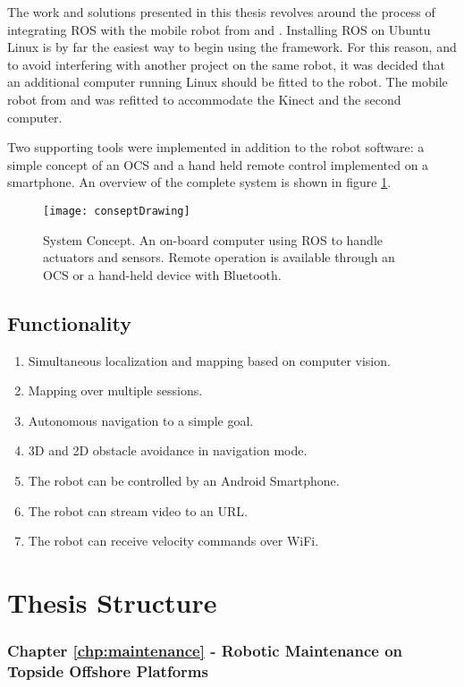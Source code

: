 The work and solutions presented in this thesis revolves around the process of integrating ROS with the mobile robot from \cite{aspunvik} and \cite{berg}. Installing ROS on Ubuntu Linux is by far the easiest way to begin using the framework. For this reason, and to avoid interfering with another project on the same robot, it was decided that an additional computer running Linux should be fitted to the robot. The mobile robot from \cite{aspunvik} and \cite{berg} was refitted to accommodate the Kinect and the second computer.

Two supporting tools were implemented in addition to the robot software: a simple concept of an \ac{OCS} and a hand held remote control implemented on a smartphone. An overview of the complete system is shown in figure \ref{fig:conseptDrawing}.

\begin{figure}[h]
	\centering
	\texttt{[image: conseptDrawing]}
	\caption{System Concept. An on-board computer using \ac{ROS} to handle actuators and sensors. Remote operation is available through an \ac{OCS} or a hand-held device with Bluetooth.}
	\label{fig:conseptDrawing}
\end{figure}

\subsection{Functionality}

\begin{enumerate}
\item Simultaneous localization and mapping based on computer vision.
\item Mapping over multiple sessions.
\item Autonomous navigation to a simple goal.
\item 3D and 2D obstacle avoidance in navigation mode.
\item The robot can be controlled by an Android Smartphone.
\item The robot can stream video to an URL.
\item The robot can receive velocity commands over WiFi.
\end{enumerate} 

\section{Thesis Structure}

\subsubsection{Chapter \ref{chp:maintenance} - Robotic Maintenance on Topside Offshore Platforms} 


